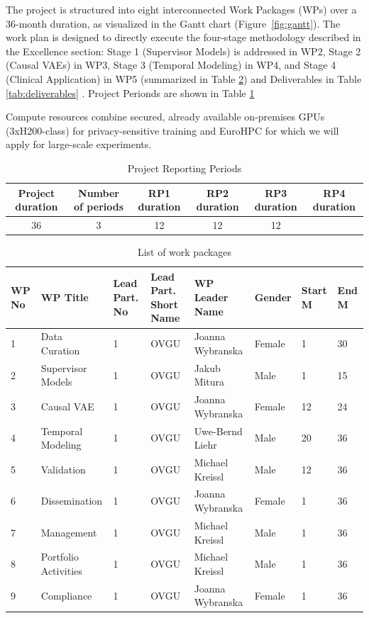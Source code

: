 \documentclass[11pt, a4paper]{article}
\begin{document}
The project is structured into eight interconnected Work Packages (WPs) over a 36-month duration, as visualized in the Gantt chart (Figure~\ref{fig:gantt}). The work plan is designed to directly execute the four-stage methodology described in the Excellence section: Stage 1 (Supervisor Models) is addressed in WP2, Stage 2 (Causal VAEs) in WP3, Stage 3 (Temporal Modeling) in WP4, and Stage 4 (Clinical Application) in WP5 (summarized in Table \ref{tab:wp_list}) and Deliverables in Table \ref{tab:deliverables} . Project Perionds are shown in Table \ref{tab:reporting}


Compute resources combine secured, already available on-premises GPUs (3xH200-class) for privacy-sensitive training and EuroHPC for which we will apply for large-scale experiments.

\begin{table}[h!]
\centering
\begin{tabular}{|c|c|c|c|c|c|}
\hline
\textbf{Project duration} & \textbf{Number of periods} & \textbf{RP1 duration} & \textbf{RP2 duration} & \textbf{RP3 duration} & \textbf{RP4 duration} \\ \hline
36 & 3 & 12 & 12 & 12 & \cellcolor\\ \hline
\end{tabular}
\caption{Project Reporting Periods}
\label{tab:reporting}
\end{table}


\begin{table}[H]
    \centering
    \caption{List of work packages}
    \label{tab:wp_list}
    \small
    \begin{tabular}{l l l l l l l l}
        \toprule
        \textbf{WP No} & \textbf{WP Title} & \textbf{Lead Part. No} & \textbf{Lead Part. Short Name} & \textbf{WP Leader Name} & \textbf{Gender} & \textbf{Start M} & \textbf{End M} \\
        \midrule
        1 & Data Curation & 1 & OVGU & Joanna Wybranska& Female & 1 & 30 \\
        2 & Supervisor Models & 1 & OVGU & Jakub Mitura & Male & 1 & 15 \\
        3 & Causal VAE & 1 & OVGU & Joanna Wybranska& Female & 12 & 24 \\
        4 & Temporal Modeling & 1 & OVGU & Uwe-Bernd Liehr
 & Male & 20 & 36 \\
        5 & Validation & 1 & OVGU & Michael Kreissl
 &  Male & 12 & 36 \\
        6 & Dissemination & 1 & OVGU & Joanna Wybranska& Female & 1 & 36 \\
        7 & Management & 1 & OVGU & Michael Kreissl
 & Male & 1 & 36 \\
        8 & Portfolio Activities & 1 & OVGU & Michael Kreissl
 & Male & 1 & 36 \\
        9 & Compliance & 1 & OVGU & Joanna Wybranska& Female & 1 & 36 \\
        \bottomrule
    \end{tabular}
\end{table}
\end{document}
